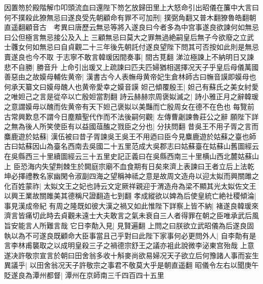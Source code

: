 因置笏於殿階解巾叩頭流血曰還陛下笏乞放歸田里上大怒命引出昭儀在簾中大言曰何不撲殺此獠無忌曰遂良受先朝顧命有罪不可加刑|{
	撲弼角翻又普木翻獠魯皓翻朝直遥翻顧音古　考異曰唐歷云無忌等將入遂良曰今者多為中宫事遂良欲諫何如無忌曰公但極言無忌接公及入上三顧無忌曰莫大之罪無過絶嗣皇后無子今欲廢之立武士彠女何如無忌曰自貞觀二十三年後先朝託付遂良望陛下問其可否按如此則是無忌賣遂良也今不取}
于志寧不敢言韓瑗因間奏事|{
	間古莧翻}
涕泣極諫上不納明日又諫悲不自勝|{
	勝音升}
上命引出瑗又上疏諫曰匹夫匹婦猶相選擇况天子乎皇后母儀萬國善惡由之故嫫母輔佐黄帝|{
	漢書古今人表幠母黄帝妃生倉林師古曰幠音謨即嫫母也何承天纂文曰嫫母醜人也黄帝愛幸之嫫音謨}
妲己傾覆殷王|{
	妲己有蘇氏之美女紂愛之唯妲己之言是從卒以亡殷妲當割翻}
詩云赫赫宗周褒姒滅之|{
	詩小雅正月之辭韓瑗之意謂嫫毋以醜而佐黄帝有天下妲己褒姒以美豔而亡殷周女在德不在色也}
每覽前古常興歎息不謂今日塵黷聖代作而不法後嗣何觀|{
	左傳曹劌諫魯莊公之辭}
願陛下詳之無為後人所笑使臣有以益國葅醢之戮臣之分也|{
	分扶問翻}
昔吳王不用子胥之言而麋鹿遊於姑蘇|{
	漢伍被曰昔子胥諫吳王吳王不用迺曰臣今見麋鹿遊於姑蘇之臺也師古曰姑蘇因山為臺名西南去吳國二十五里范成大吳郡志曰姑蘇臺在姑蘇山舊圖經云在吳縣西三十里續圖經云三十五里史記正義曰在吳縣西南三十里横山西北麓姑蘇山上}
臣恐海内失望荆棘生於闕庭宗廟不血食期有日矣來濟上表諫曰王者立后上法乾坤必擇禮教名家幽閑令淑副四海之望稱神祗之意是故周文造舟以迎太姒而興關雎之化百姓蒙祚|{
	太姒文王之妃也詩云文定厥祥親迎于渭造舟為梁不顯其光太姒佐文王以興王業故關雎美其德稱尺證翻造七到翻}
孝成縱欲以婢為后使皇統亡絶社稷傾淪|{
	事見漢成帝紀}
有周之隆既如彼大漢之禍又如此惟陛下詳察上皆不納|{
	褚遂良韓瑗來濟言皆痛切此時去貞觀未遠士大夫敢言之氣未衰自三人者得罪在朝之臣唯承武后風旨安能言人所難言哉}
它日李勣入見|{
	見賢遍翻}
上問之曰朕欲立武昭儀為后遂良固執以為不可遂良既顧命大臣事當且己乎對曰此陛下家事何必更問外人|{
	自李勣有是言李林甫襲取之以成明皇殺三子之禍德宗舒王之議亦袓此說微李泌東宫殆哉}
上意遂决許敬宗宣言於朝曰田舍翁多收十斛麥尚欲易婦况天子欲立后何豫諸人事而妄生異議乎|{
	以田舍翁况天子許敬宗之事君不敬莫大乎是朝直遥翻}
昭儀令左右以聞庚午貶遂良為潭州都督|{
	潭州在京師南三千四百四十五里}


